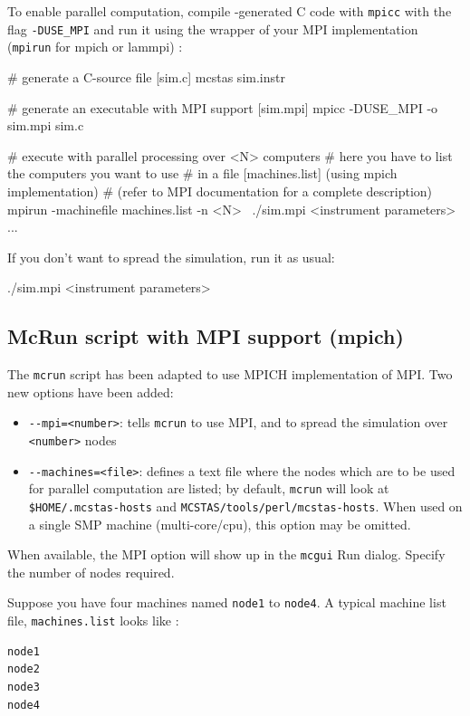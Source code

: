 To enable parallel computation, compile \mcs-generated C code
with \verb'mpicc' with the flag \verb'-DUSE_MPI' and run it using the
wrapper of your MPI implementation (\verb'mpirun' for mpich or lammpi) :
\begin{bash}
  # generate a C-source file [sim.c]
  mcstas sim.instr

  # generate an executable with MPI support [sim.mpi]
  mpicc -DUSE_MPI -o sim.mpi sim.c

  # execute with parallel processing over <N> computers
  # here you have to list the computers you want to use
  # in a file [machines.list] (using mpich implementation)
  # (refer to MPI documentation for a complete description)
  mpirun -machinefile machines.list -n <N> \
         ./sim.mpi <instrument parameters>
  ...
\end{bash}

If you don't want to spread the simulation, run it as usual:
\begin{bash}
  ./sim.mpi <instrument parameters>
\end{bash}

\subsection{McRun script with MPI support (mpich)}

The \verb'mcrun' script has been adapted to use MPICH implementation
of MPI. Two new options have been added:
\begin{itemize}
\item \verb'--mpi=<number>': tells \verb'mcrun' to use MPI, and to
  spread the simulation over \verb'<number>' nodes
\item \verb'--machines=<file>': defines a text file where the nodes which are to
  be used for parallel computation are listed; by default, \verb'mcrun' will
  look at \verb'$HOME/.mcstas-hosts' and\indexMCTOOL{mcstas-hosts}{}
  \verb'MCSTAS/tools/perl/mcstas-hosts'. When used on a single SMP machine
  (multi-core/cpu), this option may be omitted.
\end{itemize}
When available, the MPI option will show up in the \verb+mcgui+ Run
dialog. Specify the number of nodes required.

Suppose you have four machines named \verb'node1' to \verb'node4'.
A typical machine list file, \verb'machines.list' looks like :
\begin{lstlisting}
node1
node2
node3
node4
\end{lstlisting}


